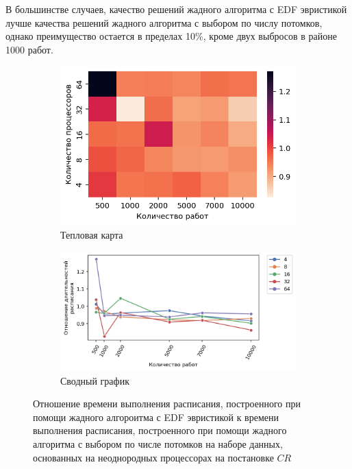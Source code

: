 В большинстве случаев, качество решений жадного алгоритма с EDF эвристикой лучше качества решений жадного алгоритма с выбором по числу потомков, однако преимущество остается в пределах 10\%, кроме двух выбросов в районе 1000 работ. 


\begin{figure}[!htbp]
    \centering
    \begin{subfigure}{0.49\textwidth}
        \includegraphics[width=\textwidth]{imgs/unbalanced/CR_EDF/times.png}
        \caption{Тепловая карта}
        \label{fig:CR-disbalanced-EDF-times-heatmap}
    \end{subfigure}
    \hfill
    \begin{subfigure}{0.49\textwidth}
        \includegraphics[width=\textwidth]{imgs/unbalanced/CR_EDF/gr_amalgamated.png}
        \caption{Сводный график}
        \label{fig:CR-disbalanced-EDF-times-compiled} 
    \end{subfigure}
    \caption{Отношение времени выполнения расписания, построенного при помощи жадного алгороитма с EDF эвристикой к времени выполнения расписания, построенного при помощи жадного алгоритма с выбором по числе потомков на наборе данных, основанных на неоднородных процессорах на постановке $CR$}
\end{figure}

